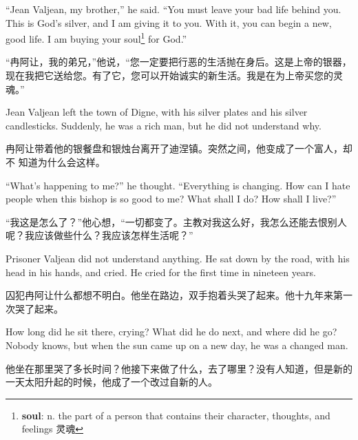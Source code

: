 \documentclass[fontset=ubuntu, zihao=5]{ctexart}
\begin{document}
\begin{paracol}{2}
  \switchcolumn*

  ``Jean Valjean, my brother,'' he said. ``You must leave your bad life behind you. This is God's silver, and I am giving it to you. With it, you can begin a new, good life. I am buying your soul\footnote{\textbf{soul}: n. the part of a person that contains their character, thoughts, and feelings 灵魂} for God.''

  \switchcolumn
  “冉阿让，我的弟兄，”他说，“您一定要把行恶的生活抛在身后。这是上帝的银器，现在我把它送给您。有了它，您可以开始诚实的新生活。我是在为上帝买您的灵魂。”

  \switchcolumn*

  \sectionbreak

  Jean Valjean left the town of Digne, with his silver plates and his silver candlesticks. Suddenly, he was a rich man, but he did not understand why.

  \switchcolumn

  \sectionbreak

  冉阿让带着他的银餐盘和银烛台离开了迪涅镇。突然之间，他变成了一个富人，却不
  知道为什么会这样。

  \switchcolumn*

  ``What's happening to me?'' he thought. ``Everything is changing. How can I hate people when this bishop is so good to me? What shall I do? How shall I live?''

  \switchcolumn
  “我这是怎么了？”他心想，“一切都变了。主教对我这么好，我怎么还能去恨别人呢？我应该做些什么？我应该怎样生活呢？”

  \switchcolumn*

  Prisoner Valjean did not understand anything. He sat down by the road, with his head in his hands, and cried. He cried for the first time in nineteen years.

  \switchcolumn

  囚犯冉阿让什么都想不明白。他坐在路边，双手抱着头哭了起来。他十九年来第一次哭了起来。

  \switchcolumn*

  How long did he sit there, crying? What did he do next, and where did he go? Nobody knows, but when the sun came up on a new day, he was a changed man.

  \switchcolumn

  他坐在那里哭了多长时间？他接下来做了什么，去了哪里？没有人知道，但是新的一天太阳升起的时候，他成了一个改过自新的人。



\end{paracol}
\end{document}

